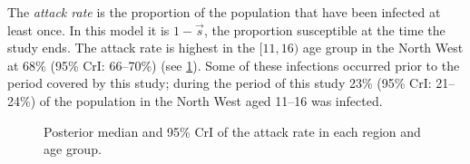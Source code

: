 \documentclass[thesis.tex]{subfiles}
\begin{document}
The \emph{attack rate} is the proportion of the population that have been infected at least once.
In this model it is $1 - \vec{s}$, the proportion susceptible at the time the study ends.
The attack rate is highest in the $[11, 16)$ age group in the North West at 68\% (95\% CrI: 66--70\%) (see \cref{SEIR:fig:attack-rates}).
Some of these infections occurred prior to the period covered by this study; during the period of this study 23\% (95\% CrI: 21--24\%) of the population in the North West aged 11--16 was infected.
\begin{figure}
    \caption{Posterior median and 95\% CrI of the attack rate in each region and age group.}
    \label{SEIR:fig:attack-rates}
\end{figure}
\end{document}

